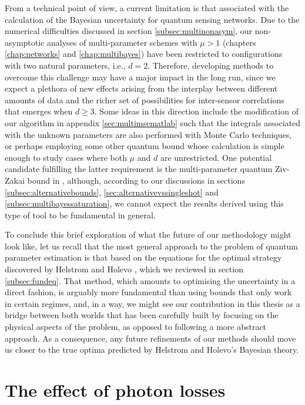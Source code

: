 From a technical point of view, a current limitation is that associated with the calculation of the Bayesian uncertainty for quantum sensing networks. Due to the numerical difficulties discussed in section \ref{subsec:multinonasym}, our non-asymptotic analyses of multi-parameter schemes with $\mu > 1$ (chapters \ref{chap:networks} and \ref{chap:multibayes}) have been restricted to configurations with two natural parameters, i.e., $d = 2$. Therefore, developing methods to overcome this challenge may have a major impact in the long run, since we expect a plethora of new effects arising from the interplay between different amounts of data and the richer set of possibilities for inter-sensor correlations that emerges when $d \geqslant 3$. Some ideas in this direction include the modification of our algorithm in appendix \ref{sec:multimsematlab} such that the integrals associated with the unknown parameters are also performed with Monte Carlo techniques, or perhaps employing some other quantum bound whose calculation is simple enough to study cases where both $\mu$ and $d$ are unrestricted. One potential candidate fulfilling the latter requirement is the multi-parameter quantum Ziv-Zakai bound in \cite{zhang2014}, although, according to our discussions in sections \ref{subsec:alternativebounds}, \ref{sec:alternativevssingleshot} and \ref{subsec:multibayessaturation}, we cannot expect the results derived using this type of tool to be fundamental in general.  

To conclude this brief exploration of what the future of our methodology might look like, let us recall that the most general approach to the problem of quantum parameter estimation is that based on the equations for the optimal strategy discovered by Helstrom and Holevo \cite{helstrom1976, helstrom1974, holevo1973b, holevo1973}, which we reviewed in section \ref{subsec:fundeq}. That method, which amounts to optimising the uncertainty in a direct fashion, is arguably more fundamental than using bounds that only work in certain regimes, and, in a way, we might see our contribution in this thesis as a bridge between both worlds that has been carefully built by focusing on the physical aspects of the problem, as opposed to following a more abstract approach. As a consequence, any future refinements of our methods should move us closer to the true optima predicted by Helstrom and Holevo's Bayesian theory.

\section{The effect of photon losses}
\label{loss}

